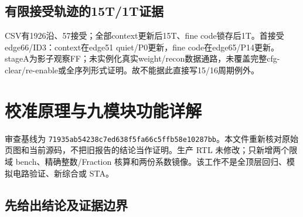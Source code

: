 \documentclass[UTF8,fontset=fandol,10pt,a4paper,openany]{ctexrep}
\newcommand{\code}[1]{\nolinkurl{#1}}
\begin{document}
\section{有限接受轨迹的15T/1T证据}
\begin{center}\end{center}
CSV有1926沿、57接受；全部context更新后15T、fine code锁存后1T。首接受edge66/ID3：context在edge51 quiet/P0更新，fine code在edge65/P14更新。stageA为影子观察FF；未实例化真实weight/recon数据通路，未覆盖完整cfg-clear/re-enable或全序列形式证明。故不能据此直接写15/16周期例外。
\appendix

\chapter{校准原理与九模块功能详解}


审查基线为 \code{71935ab54238c7ed638f5fa66c5ffb58e10287bb}。本文件重新核对原始页图和当前源码，不把旧报告的结论当作证明。生产 RTL 未修改；只新增两个限域 bench、精确整数/Fraction 核算和两份系数镜像。该工作不是全顶层回归、模拟电路验证、新综合或 STA。


\section{先给出结论及证据边界}
\end{document}
